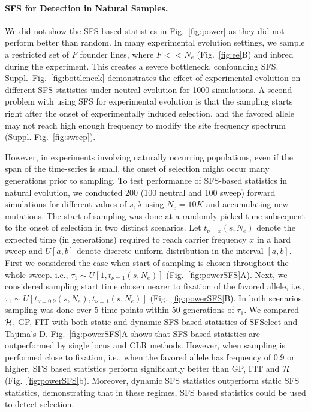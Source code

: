 \paragraph{SFS for Detection in Natural Samples.} We did not show the
SFS based statistics in Fig.~\ref{fig:power} as they did not perform
better than random. In many experimental evolution settings, we sample
a restricted set of $F$ founder lines, where $F<<N_e$
(Fig.~\ref{fig:ee}B) and inbred during the experiment. This creates a severe 
bottleneck, confounding
SFS. Suppl.~Fig.~\ref{fig:bottleneck} demonstrates the effect of
experimental evolution on different SFS statistics under neutral
evolution for 1000 simulations. A second problem with using SFS for
experimental evolution is that the sampling starts right after the
onset of experimentally induced selection, and the favored allele may
not reach high enough frequency to modify the site frequency spectrum
(Suppl. Fig.~\ref{fig:sweep}).

However, in experiments involving naturally occurring populations,
even if the span of the time-series is small, the onset of selection
might occur many generations prior to sampling. To test performance of
SFS-based statistics in natural evolution, we conducted 200 (100
neutral and 100 sweep) forward simulations for different values of
$s,\lambda$ using $N_e=10K$ and accumulating new mutations. The start
of sampling was done at a randomly picked time subsequent to the onset
of selection in two distinct scenarios. Let $t_{\nu=x}(s,N_e)$ denote
the expected time (in generations) required to reach carrier frequency
$x$ in a hard sweep and $U[a,b]$ denote discrete uniform distribution
in the interval $[a,b]$. First we considered the case when start of
sampling is chosen throughout the whole sweep. i.e., $\tau_1 \sim
U\left[1,t_{\nu=1}(s,N_e)\right]$ (Fig.~\ref{fig:powerSFS}A). Next, we
considered sampling start time chosen nearer to fixation of the
favored allele, i.e., $\tau_1 \sim
U\left[t_{\nu=0.9}(s,N_e),t_{\nu=1}(s,N_e)\right]$
(Fig.~\ref{fig:powerSFS}B). In both scenarios, sampling was done over
$5$ time points within $50$ generations of $\tau_1$. We compared
${\cal H}$, GP, FIT with both static and dynamic SFS based statistics of
SFSelect and Tajima's D. Fig.~\ref{fig:powerSFS}A shows that SFS based
statistics are outperformed by single locus and CLR methods. However,
when sampling is performed close to fixation, i.e., when the favored
allele has frequency of 0.9 or higher, SFS based statistics perform
significantly better than GP, FIT and ${\cal H}$
(Fig.~\ref{fig:powerSFS}b). Moreover, dynamic SFS statistics
outperform static SFS statistics, demonstrating that in these regimes,
SFS based statistics could be used to detect selection.


